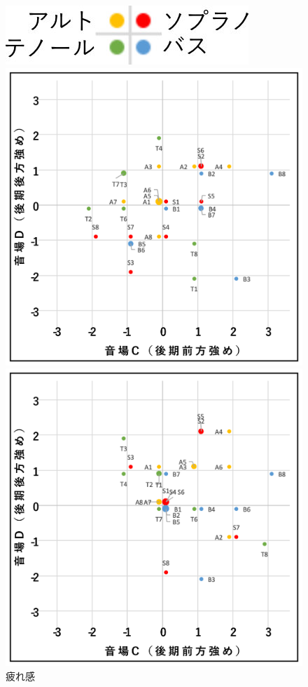 \documentclass[11pt,a4j]{jreport}
\begin{document}
\begin{figure}[H]
  \begin{minipage}{1\linewidth}
    \centering
    \includegraphics[scale=.7]{images/subjectiveExp/scat_0_legend.jpg}
  \end{minipage}

  \begin{minipage}{0.5\linewidth}
    \centering
    \includegraphics[width=.9\linewidth]{images/subjectiveExp/scat_late_08tiredness.png}
    \caption*{疲れ感}
  \end{minipage}%
  \begin{minipage}{0.5\linewidth}
    \centering
    \includegraphics[width=.9\linewidth]{images/subjectiveExp/scat_late_09dynamics.png}

\end{minipage}
\end{figure}
\end{document}
